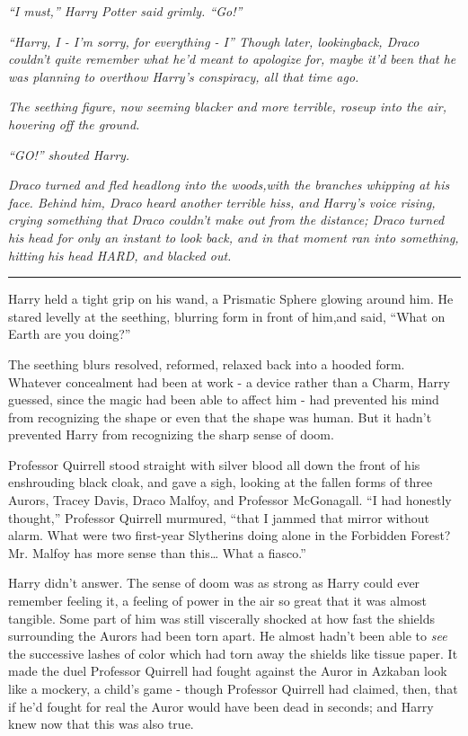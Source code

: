 \emph{``I must,'' Harry Potter said grimly. ``Go!''}

\emph{``Harry, I - I'm sorry, for everything - I'' Though later, lookingback, Draco couldn't quite remember what he'd meant to apologize for, maybe it'd been that he was planning to overthow Harry's conspiracy, all that time ago.}

\emph{The seething figure, now seeming blacker and more terrible, roseup into the air, hovering off the ground.}

\emph{``GO!'' shouted Harry.}

\emph{Draco turned and fled headlong into the woods,with the branches whipping at his face. Behind him, Draco heard another terrible hiss, and Harry's voice rising, crying something that Draco couldn't make out from the distance; Draco turned his head for only an instant to look back, and in that moment ran into something, hitting his head HARD, and blacked out.}

\begin{center}\rule{3in}{0.4pt}\end{center}

Harry held a tight grip on his wand, a Prismatic Sphere glowing around him. He stared levelly at the seething, blurring form in front of him,and said, ``What on Earth are you doing?''

The seething blurs resolved, reformed, relaxed back into a hooded form. Whatever concealment had been at work - a device rather than a Charm, Harry guessed, since the magic had been able to affect him - had prevented his mind from recognizing the shape or even that the shape was human. But it hadn't prevented Harry from recognizing the sharp sense of doom.

Professor Quirrell stood straight with silver blood all down the front of his enshrouding black cloak, and gave a sigh, looking at the fallen forms of three Aurors, Tracey Davis, Draco Malfoy, and Professor McGonagall. ``I had honestly thought,'' Professor Quirrell murmured, ``that I jammed that mirror without alarm. What were two first-year Slytherins doing alone in the Forbidden Forest? Mr. Malfoy has more sense than this\ldots{} What a fiasco.''

Harry didn't answer. The sense of doom was as strong as Harry could ever remember feeling it, a feeling of power in the air so great that it was almost tangible. Some part of him was still viscerally shocked at how fast the shields surrounding the Aurors had been torn apart. He almost hadn't been able to \emph{see} the successive lashes of color which had torn away the shields like tissue paper. It made the duel Professor Quirrell had fought against the Auror in Azkaban look like a mockery, a child's game - though Professor Quirrell had claimed, then, that if he'd fought for real the Auror would have been dead in seconds; and Harry knew now that this was also true.

